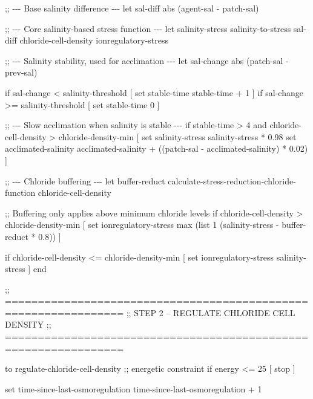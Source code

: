 \documentclass[
]{book}
\newenvironment{Shaded}{\begin{snugshade}}{\end{snugshade}}
\newcommand{\NormalTok}[1]{#1}
\begin{document}
\begin{Shaded}
\begin{Highlighting}[]
\NormalTok{  ;; {-}{-}{-} Base salinity difference {-}{-}{-}}
\NormalTok{  let sal{-}diff abs (agent{-}sal {-} patch{-}sal)}

\NormalTok{  ;; {-}{-}{-} Core salinity{-}based stress function {-}{-}{-}}
\NormalTok{  let salinity{-}stress salinity{-}to{-}stress sal{-}diff chloride{-}cell{-}density ionregulatory{-}stress}

\NormalTok{  ;; {-}{-}{-} Salinity stability, used for acclimation {-}{-}{-}}
\NormalTok{  let sal{-}change abs (patch{-}sal {-} prev{-}sal)}
  
\NormalTok{  if sal{-}change \textless{} salinity{-}threshold [}
\NormalTok{    set stable{-}time stable{-}time + 1}
\NormalTok{  ]}
\NormalTok{  if sal{-}change \textgreater{}= salinity{-}threshold [}
\NormalTok{    set stable{-}time 0}
\NormalTok{  ]}

\NormalTok{  ;; {-}{-}{-} Slow acclimation when salinity is stable {-}{-}{-}}
\NormalTok{  if stable{-}time \textgreater{} 4 and chloride{-}cell{-}density \textgreater{} chloride{-}density{-}min [}
\NormalTok{    set salinity{-}stress salinity{-}stress * 0.98}
\NormalTok{    set acclimated{-}salinity acclimated{-}salinity +}
\NormalTok{      ((patch{-}sal {-} acclimated{-}salinity) * 0.02)}
\NormalTok{  ]}

\NormalTok{  ;; {-}{-}{-} Chloride buffering {-}{-}{-}}
\NormalTok{  let buffer{-}reduct calculate{-}stress{-}reduction{-}chloride{-}function chloride{-}cell{-}density}

\NormalTok{  ;; Buffering only applies above minimum chloride levels}
\NormalTok{  if chloride{-}cell{-}density \textgreater{} chloride{-}density{-}min [}
\NormalTok{    set ionregulatory{-}stress max (list 1 (salinity{-}stress {-} buffer{-}reduct * 0.8))}
\NormalTok{  ]}

\NormalTok{  if chloride{-}cell{-}density \textless{}= chloride{-}density{-}min [}
\NormalTok{    set ionregulatory{-}stress salinity{-}stress}
\NormalTok{  ]}
\NormalTok{end}


\NormalTok{;; ================================================================}
\NormalTok{;; STEP 2 – REGULATE CHLORIDE CELL DENSITY}
\NormalTok{;; ================================================================}

\NormalTok{to regulate{-}chloride{-}cell{-}density}
\NormalTok{  ;; energetic constraint}
\NormalTok{  if energy \textless{}= 25 [ stop ]}

\NormalTok{  set time{-}since{-}last{-}osmoregulation time{-}since{-}last{-}osmoregulation + 1}


\end{Highlighting}
\end{Shaded}
\end{document}
